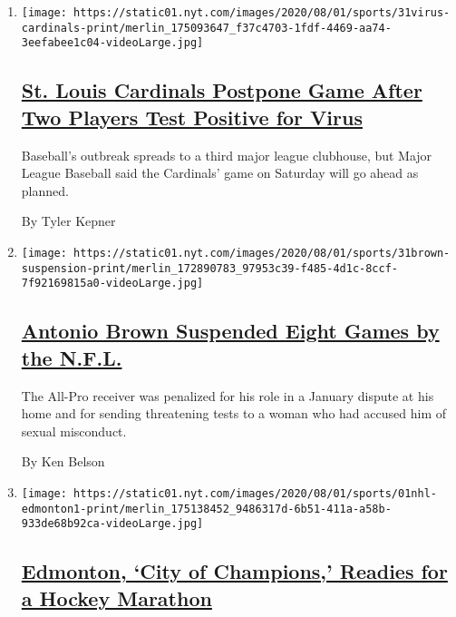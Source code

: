 \begin{enumerate}
\def\labelenumi{\arabic{enumi}.}
\item
  \texttt{[image: https://static01.nyt.com/images/2020/08/01/sports/31virus-cardinals-print/merlin\_175093647\_f37c4703-1fdf-4469-aa74-3eefabee1c04-videoLarge.jpg]}

  \hypertarget{st-louis-cardinals-postpone-game-after-two-players-test-positive-for-virus}{%
  \subsection{\texorpdfstring{\href{/2020/07/31/sports/baseball/cardinals-twins-coronavirus-mlb.html}{St.
  Louis Cardinals Postpone Game After Two Players Test Positive for
  Virus}}{St. Louis Cardinals Postpone Game After Two Players Test Positive for Virus}}\label{st-louis-cardinals-postpone-game-after-two-players-test-positive-for-virus}}

  Baseball's outbreak spreads to a third major league clubhouse, but
  Major League Baseball said the Cardinals' game on Saturday will go
  ahead as planned.

  By Tyler Kepner
\item
  \texttt{[image: https://static01.nyt.com/images/2020/08/01/sports/31brown-suspension-print/merlin\_172890783\_97953c39-f485-4d1c-8ccf-7f92169815a0-videoLarge.jpg]}

  \hypertarget{antonio-brown-suspended-eight-games-by-the-nfl}{%
  \subsection{\texorpdfstring{\href{/2020/07/31/sports/football/antonio-brown-suspension-nfl.html}{Antonio
  Brown Suspended Eight Games by the
  N.F.L.}}{Antonio Brown Suspended Eight Games by the N.F.L.}}\label{antonio-brown-suspended-eight-games-by-the-nfl}}

  The All-Pro receiver was penalized for his role in a January dispute
  at his home and for sending threatening tests to a woman who had
  accused him of sexual misconduct.

  By Ken Belson
\item
  \texttt{[image: https://static01.nyt.com/images/2020/08/01/sports/01nhl-edmonton1-print/merlin\_175138452\_9486317d-6b51-411a-a58b-933de68b92ca-videoLarge.jpg]}

  \hypertarget{edmonton-city-of-champions-readies-for-a-hockey-marathon}{%
  \subsection{\texorpdfstring{\href{/2020/08/01/sports/hockey/edmonton-nhl-playoffs.html}{Edmonton,
  `City of Champions,' Readies for a Hockey
  Marathon}}{Edmonton, `City of Champions,' Readies for a Hockey Marathon}}\label{edmonton-city-of-champions-readies-for-a-hockey-marathon}}


\end{enumerate}
